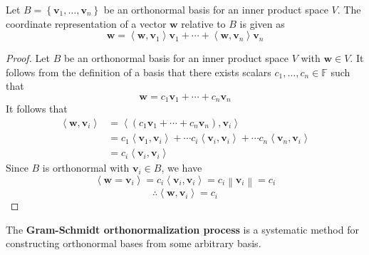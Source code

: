\begin{theorem}
    Let \(B=\left\{ \mathbf{v}_1,\ldots,\mathbf{v}_n \right\} \) be an orthonormal basis for an inner product space \(V\). The coordinate representation of a vector \(\mathbf{w}\) relative to \(B\) is given as
    \[
        \mathbf{w}=\left\langle \mathbf{w},\mathbf{v}_1 \right\rangle \mathbf{v}_{1}+\cdots+\left\langle \mathbf{w},\mathbf{v}_n \right\rangle \mathbf{v}_n
    \]
\end{theorem}
\begin{proof}
    Let \(B\) be an orthonormal basis for an inner product space \(V\) with \(\mathbf{w}\in V\). It follows from the definition of a basis that there exists scalars \(c_1,\ldots,c_n\in\mathbb{F}\) such that
    \[
        \mathbf{w}=c_1 \mathbf{v}_1 +\cdots+c_n \mathbf{v}_n
    \]
    It follows that 
    \begin{align*}
        \left\langle \mathbf{w},\mathbf{v}_i \right\rangle &=\left\langle \left( c_1 \mathbf{v}_1 +\cdots+c_n \mathbf{v}_n \right),\mathbf{v}_i  \right\rangle\\
        &= c_1 \left\langle \mathbf{v}_1,\mathbf{v}_i \right\rangle +\cdots c_i\left\langle \mathbf{v}_i,\mathbf{v}_i \right\rangle +\cdots c_n\left\langle \mathbf{v}_n,\mathbf{v}_i \right\rangle\\
        &= c_i \left\langle \mathbf{v}_i,\mathbf{v}_i \right\rangle 
    \end{align*}
    Since \(B\) is orthonormal with \(\mathbf{v}_i\in B\), we have 
    \[
        \left\langle \mathbf{w}=\mathbf{v}_i \right\rangle =c_i \left\langle \mathbf{v}_i,\mathbf{v}_i \right\rangle =c_i \left\lVert \mathbf{v}_i \right\rVert =c_i
    \]
    \[
        \therefore \left\langle \mathbf{w},\mathbf{v}_i \right\rangle =c_i
    \]
\end{proof}
The \textbf{Gram-Schmidt orthonormalization process} is a systematic method for constructing orthonormal bases from some arbitrary basis.
